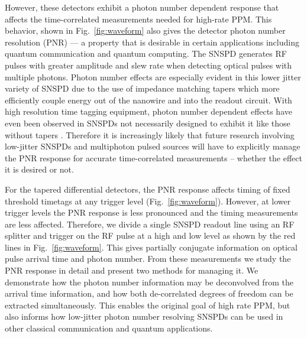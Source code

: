 \documentclass[11pt]{caltech_thesis} %
\begin{document}
However, these detectors exhibit a photon number dependent response that affects the time-correlated measurements needed for high-rate PPM. This behavior, shown in Fig.~\ref{fig:waveform} also gives the detector photon number resolution (PNR) --- a property that is desirable in certain applications including quantum communication and quantum computing. The SNSPD generates RF pulses with greater amplitude and slew rate when detecting optical pulses with multiple photons. Photon number effects are especially evident in this lower jitter variety of SNSPD due to the use of impedance matching tapers which more efficiently couple energy out of the nanowire and into the readout circuit. With high resolution time tagging equipment, photon number dependent effects have even been observed in SNSPDs not necessarily designed to exhibit it \autocite{schapeler2023superconducting,sauer2023resolving} like those without tapers \autocite{Cahall2017SlewRatePNR}. Therefore it is increasingly likely that future research involving low-jitter SNSPDs and multiphoton pulsed sources will have to explicitly manage the PNR response for accurate time-correlated measurements -- whether the effect it is desired or not.

For the tapered differential detectors, the PNR response affects timing of fixed threshold timetags at any trigger level (Fig.~\ref{fig:waveform}). However, at lower trigger levels the PNR response is less pronounced and the timing measurements are less affected. Therefore, we divide a single SNSPD readout line using an RF splitter and trigger on the RF pulse at a high and low level as shown by the red lines in Fig.~\ref{fig:waveform}. This gives partially conjugate information on optical pulse arrival time and photon number. From these measurements we study the PNR response in detail and present two methods for managing it. We demonstrate how the photon number information may be deconvolved from the arrival time information, and how both de-correlated degrees of freedom can be extracted simultaneously. This enables the original goal of high rate PPM, but also informs how low-jitter photon number resolving SNSPDs can be used in other classical communication and quantum applications.
\end{document}
